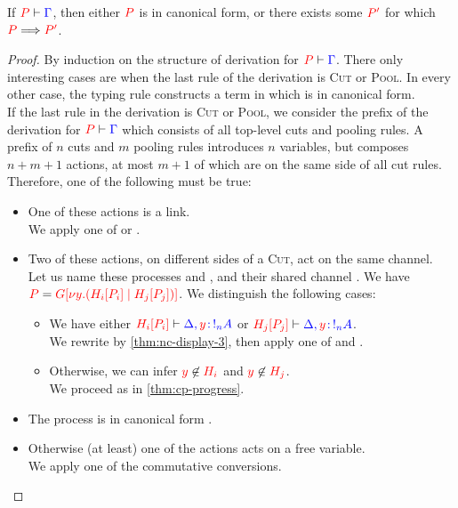\begin{theorem}[Progress]\label{thm:nc-progress}
  If $\seq[{ P }]{ \Gamma }$,
  then either $\tm{P}$ is in canonical form,
  or there exists some $\tm{P'}$ for which $\reducesto{P}{P'}$.
\end{theorem}
\begin{proof}
  By induction on the structure of derivation for $\seq[{ P }]{ \Gamma }$.
  There only interesting cases are when the last rule of the derivation is
  \textsc{Cut} or \textsc{Pool}. In every other case, the typing rule constructs
  a term in which is in canonical form. 
  \\
  If the last rule in the derivation is \textsc{Cut} or \textsc{Pool}, we
  consider the prefix of the derivation for $\seq[{ P }]{ \Gamma}$ which
  consists of all top-level cuts and pooling rules. A prefix of $n$ cuts and $m$
  pooling rules introduces $n$ variables, but composes $n+m+1$ actions, at most
  $m+1$ of which are on the same side of all cut rules.
  Therefore, one of the following must be true:
  \begin{itemize}
  \item
    One of these actions is a link.
    \\
    We apply one of  or .
  \item
    Two of these actions, on different sides of a \textsc{Cut}, act on the same channel.
    \\
    Let us name these processes  and , and their shared channel
    . We have 
    $\tm{P} = \tm{\cpPlug{G}{\cpCut{y}{\cpPlug{H_i}{P_i}}{\cpPlug{H_j}{P_j}}}}$.
    We distinguish the following cases:
    \begin{itemize}
    \item
      We have either
      $\seq[{ \cpPlug{H_i}{P_i}}]{ \Delta, \tmty{y}{\take[n]{A}} }$ or
      $\seq[{ \cpPlug{H_j}{P_j} }]{\Delta, \tmty{y}{\take[n]{A}} }$.
      \\
      We rewrite by \cref{thm:nc-display-3}, then apply one of  and .
    \item
      Otherwise, we can infer $\notFreeIn{y}{H_i}$ and $\notFreeIn{y}{H_j}$.
      \\
      We proceed as in \cref{thm:cp-progress}. 
    \end{itemize}
  \item
    The process is in canonical form .
  \item
    Otherwise (at least) one of the actions acts on a free variable.
    \\
    We apply one of the commutative conversions.
  \end{itemize}
\end{proof}
